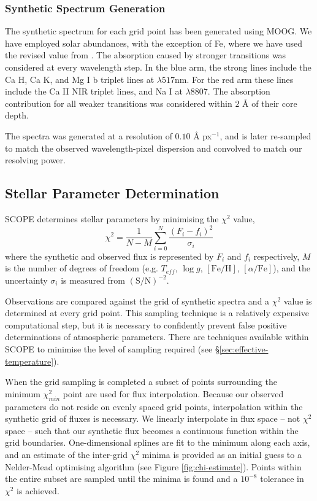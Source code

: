 \documentclass{emulateapj}
\begin{document}
\subsubsection{Synthetic Spectrum Generation}
\label{sec:synth-generation}
The synthetic spectrum for each grid point has been generated using MOOG. We have employed \citet{Anders;Grevesse_1989} solar abundances, with the exception of Fe, where we have used the revised value from \citet{Asplund;et-al_2005}. The absorption caused by stronger transitions was considered at every wavelength step. In the blue arm, the strong lines include the Ca H, Ca K, and Mg I b triplet lines at $\lambda517$nm. For the red arm these lines include the Ca II NIR triplet lines, and Na I at $\lambda8807$. The absorption contribution for all weaker transitions was considered within $2$ \AA{} of their core depth. 

The spectra was generated at a resolution of $0.10$ \AA{} px$^{-1}$, and is later re-sampled to match the observed wavelength-pixel dispersion and convolved to match our resolving power.

\subsection{Stellar Parameter Determination}

SCOPE determines stellar parameters by minimising the $\chi^2$ value,
\begin{equation}
\chi^2 = \frac{1}{N-M}\sum\limits_{i=0}^{N}\frac{(F_i - f_i)^2}{\sigma_i}
\end{equation}
\noindent{}where the synthetic and observed flux is represented by $F_i$ and $f_i$ respectively, $M$ is the number of degrees of freedom (e.g. $T_{eff}$, $\log{g}$, $[\mbox{Fe}/\mbox{H}]$, $[\alpha/\mbox{Fe}]$), and the uncertainty $\sigma_i$ is measured from $(\mbox{S}/\mbox{N})^{-2}$.

Observations are compared against the grid of synthetic spectra and a $\chi^2$ value is determined at every grid point. This sampling technique is a relatively expensive computational step, but it is necessary to confidently prevent false positive determinations of atmospheric parameters. There are techniques available within SCOPE to minimise the level of sampling required (see \S\ref{sec:effective-temperature}).

When the grid sampling is completed a subset of points surrounding the minimum $\chi_{min}^2$ point are used for flux interpolation. Because our observed parameters do not reside on evenly spaced grid points, interpolation within the synthetic grid of fluxes is necessary. We linearly interpolate in flux space \--- not $\chi^2$ space \--- such that our synthetic flux becomes a continuous function within the grid boundaries. One-dimensional splines are fit to the minimum along each axis, and an estimate of the inter-grid $\chi^2$ minima is provided as an initial guess to a Nelder-Mead optimising algorithm (see Figure \ref{fig:chi-estimate}). Points within the entire subset are sampled until the minima is found and a $10^{-8}$ tolerance in $\chi^2$ is achieved. 
\end{document}
